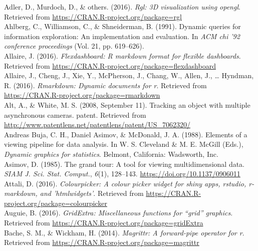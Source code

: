 \documentclass[12pt,]{isuthesis}
\begin{document}

\hypertarget{ref-rgl}{}
Adler, D., Murdoch, D., \& others. (2016). \emph{Rgl: 3D visualization
using opengl}. Retrieved from
\url{https://CRAN.R-project.org/package=rgl}
\\
\hypertarget{ref-Ahlberg:1991}{}
Ahlberg, C., Williamson, C., \& Shneiderman, B. (1991). Dynamic queries
for information exploration: An implementation and evaluation. In
\emph{ACM chi '92 conference proceedings} (Vol. 21, pp. 619--626).
\\
\hypertarget{ref-flexdashboard}{}
Allaire, J. (2016). \emph{Flexdashboard: R markdown format for flexible
dashboards}. Retrieved from
\url{https://CRAN.R-project.org/package=flexdashboard}
\\
\hypertarget{ref-rmarkdown}{}
Allaire, J., Cheng, J., Xie, Y., McPherson, J., Chang, W., Allen, J.,
\ldots{} Hyndman, R. (2016). \emph{Rmarkdown: Dynamic documents for r}.
Retrieved from \url{https://CRAN.R-project.org/package=rmarkdown}
\\
\hypertarget{ref-patent}{}
Alt, A., \& White, M. S. (2008, September 11). Tracking an object with
multiple asynchronous cameras. patent. Retrieved from
\url{http://www.patentlens.net/patentlens/patent/US_7062320/}
\\
\hypertarget{ref-viewing-pipeline}{}
Andreas Buja, C. H., Daniel Asimov, \& McDonald, J. A. (1988). Elements
of a viewing pipeline for data analysis. In W. S. Cleveland \& M. E.
McGill (Eds.), \emph{Dynamic graphics for statistics}. Belmont,
California: Wadsworth, Inc.
\\
\hypertarget{ref-grand-tour}{}
Asimov, D. (1985). The grand tour: A tool for viewing multidimensional
data. \emph{SIAM J. Sci. Stat. Comput.}, \emph{6}(1), 128--143.
\url{https://doi.org/10.1137/0906011}
\\
\hypertarget{ref-colourpicker}{}
Attali, D. (2016). \emph{Colourpicker: A colour picker widget for shiny
apps, rstudio, r-markdown, and 'htmlwidgets'}. Retrieved from
\url{https://CRAN.R-project.org/package=colourpicker}
\\
\hypertarget{ref-gridExtra}{}
Auguie, B. (2016). \emph{GridExtra: Miscellaneous functions for ``grid'' graphics}. Retrieved from \url{https://CRAN.R-project.org/package=gridExtra}
\\
\hypertarget{ref-magrittr}{}
Bache, S. M., \& Wickham, H. (2014). \emph{Magrittr: A forward-pipe operator for r}. Retrieved from \url{https://CRAN.R-project.org/package=magrittr}
\end{document}
